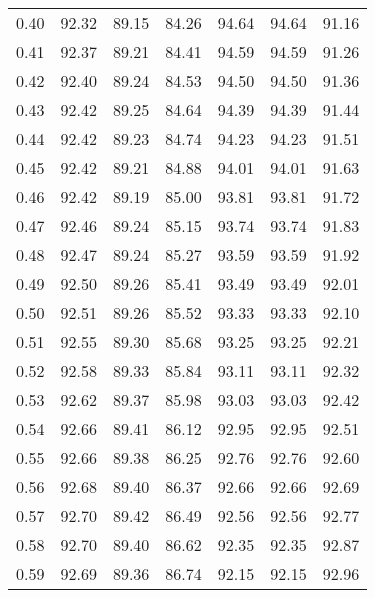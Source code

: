 \begin{tabular}{|c|c|c|c|c|c|c|}
      0.40 &     92.32 &     89.15 &      84.26 &   94.64 &      94.64 &         91.16 \\
      0.41 &     92.37 &     89.21 &      84.41 &   94.59 &      94.59 &         91.26 \\
      0.42 &     92.40 &     89.24 &      84.53 &   94.50 &      94.50 &         91.36 \\
      0.43 &     92.42 &     89.25 &      84.64 &   94.39 &      94.39 &         91.44 \\
      0.44 &     92.42 &     89.23 &      84.74 &   94.23 &      94.23 &         91.51 \\
      0.45 &     92.42 &     89.21 &      84.88 &   94.01 &      94.01 &         91.63 \\
      0.46 &     92.42 &     89.19 &      85.00 &   93.81 &      93.81 &         91.72 \\
      0.47 &     92.46 &     89.24 &      85.15 &   93.74 &      93.74 &         91.83 \\
      0.48 &     92.47 &     89.24 &      85.27 &   93.59 &      93.59 &         91.92 \\
      0.49 &     92.50 &     89.26 &      85.41 &   93.49 &      93.49 &         92.01 \\
      0.50 &     92.51 &     89.26 &      85.52 &   93.33 &      93.33 &         92.10 \\
      0.51 &     92.55 &     89.30 &      85.68 &   93.25 &      93.25 &         92.21 \\
      0.52 &     92.58 &     89.33 &      85.84 &   93.11 &      93.11 &         92.32 \\
      0.53 &     92.62 &     89.37 &      85.98 &   93.03 &      93.03 &         92.42 \\
      0.54 &     92.66 &     89.41 &      86.12 &   92.95 &      92.95 &         92.51 \\
      0.55 &     92.66 &     89.38 &      86.25 &   92.76 &      92.76 &         92.60 \\
      0.56 &     92.68 &     89.40 &      86.37 &   92.66 &      92.66 &         92.69 \\
      0.57 &     92.70 &     89.42 &      86.49 &   92.56 &      92.56 &         92.77 \\
      0.58 &     92.70 &     89.40 &      86.62 &   92.35 &      92.35 &         92.87 \\
      0.59 &     92.69 &     89.36 &      86.74 &   92.15 &      92.15 &         92.96 \\

\end{tabular}
